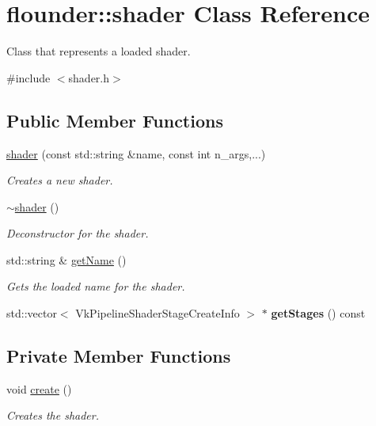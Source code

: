\hypertarget{classflounder_1_1shader}{}\section{flounder\+:\+:shader Class Reference}
\label{classflounder_1_1shader}


Class that represents a loaded shader.  




{\ttfamily \#include $<$shader.\+h$>$}

\subsection*{Public Member Functions}
\begin{DoxyCompactItemize}
\item 
\hyperlink{classflounder_1_1shader_a0ef1d1ad999d4d36cdcbd01aee19fc40}{shader} (const std\+::string \&name, const int n\+\_\+args,...)
\begin{DoxyCompactList}\small\item\em Creates a new shader. \end{DoxyCompactList}\item 
\hyperlink{classflounder_1_1shader_abd3f0fc712e7e178f18bf275c85e3337}{$\sim$shader} ()
\begin{DoxyCompactList}\small\item\em Deconstructor for the shader. \end{DoxyCompactList}\item 
std\+::string \& \hyperlink{classflounder_1_1shader_a5971b780ec6535aeb0ca70fefd41daa9}{get\+Name} ()
\begin{DoxyCompactList}\small\item\em Gets the loaded name for the shader. \end{DoxyCompactList}\item 
\mbox{\label{classflounder_1_1shader_a3b002dd2d880e1b88eeea5c229a72347}} 
std\+::vector$<$ Vk\+Pipeline\+Shader\+Stage\+Create\+Info $>$ $\ast$ {\bfseries get\+Stages} () const
\end{DoxyCompactItemize}
\subsection*{Private Member Functions}
\begin{DoxyCompactItemize}
\item 
void \hyperlink{classflounder_1_1shader_a671f6dea2db9272be68f2b9ebd021fbf}{create} ()
\begin{DoxyCompactList}\small\item\em Creates the shader. \end{DoxyCompactList}\end{DoxyCompactItemize}
